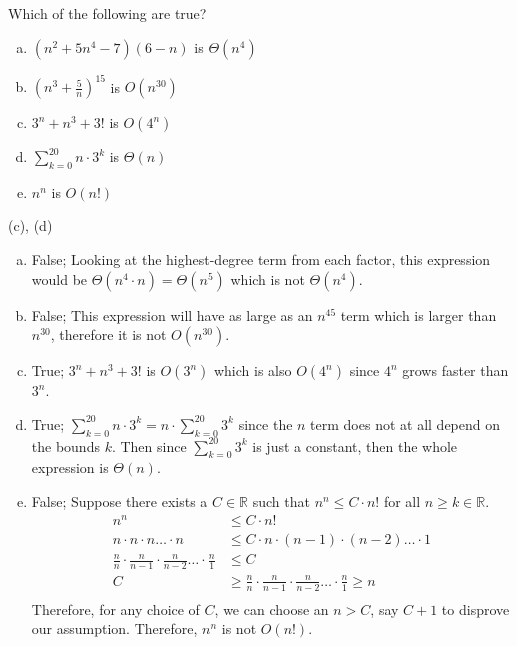 Which of the following are true?

\begin{enumerate}[a)]
    \item $(n^2 + 5n^4 - 7)(6 - n)$ is $\Theta (n^4)$
    \item $(n^3 + \frac{5}{n})^{15}$ is $O(n^{30})$
    \item $3^n + n^3 + 3!$ is $O(4^n)$
    \item $\sum\limits_{k=0}^{20} n \cdot 3^k$ is $\Theta(n)$
    \item $n^n$ is $O(n!)$
\end{enumerate}

\begin{solution}
(c), (d)\\
\begin{enumerate}[a)]
    \item False; Looking at the highest-degree term from each factor, this expression would be $\Theta (n^4 \cdot n) = \Theta (n^5)$ which is not $\Theta (n^4)$.
    \item False; This expression will have as large as an $n^{45}$ term which is larger than $n^{30}$, therefore it is not $O(n^{30})$.
    \item True; $3^n + n^3 + 3!$ is $O(3^n)$ which is also $O(4^n)$ since $4^n$ grows faster than $3^n$.
    \item True; $\sum\limits_{k=0}^{20} n \cdot 3^k = n \cdot \sum\limits_{k=0}^{20} 3^k$ since the $n$ term does not at all depend on the bounds $k$. Then since $\sum\limits_{k=0}^{20} 3^k$ is just a constant, then the whole expression is $\Theta(n)$.
    \item False; Suppose there exists a $C \in \mathbb{R}$ such that $n^n \leq C \cdot n!$ for all $n \geq k \in \mathbb{R}$.
    \begin{align*}
        n^n &\leq C \cdot n!\\
        n \cdot n \cdot n \dots \cdot n &\leq C \cdot n \cdot (n - 1) \cdot (n - 2) \dots \cdot 1\\
        \frac{n}{n} \cdot \frac{n}{n - 1} \cdot \frac{n}{n - 2} \dots \cdot \frac{n}{1} &\leq C\\
        C &\geq \frac{n}{n} \cdot \frac{n}{n - 1} \cdot \frac{n}{n - 2} \dots \cdot \frac{n}{1} \geq n\\
    \end{align*}
    Therefore, for any choice of $C$, we can choose an $n > C$, say $C +1$ to disprove our assumption. Therefore, $n^n$ is not $O(n!)$.
\end{enumerate}
\end{solution}

